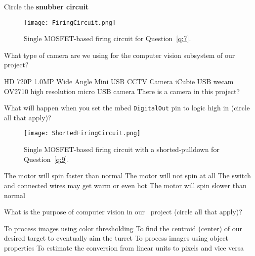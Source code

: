 \documentclass[addpoints,answers]{exam}
\begin{document}
\begin{questions}
\clearpage
\question[1]\label{q:7}
Circle the \textbf{snubber circuit} 
\begin{figure}[h]
\centering
	\texttt{[image: FiringCircuit.png]}
	\caption{Single MOSFET-based firing circuit for Question~\ref{q:7}.}
	\label{fig:FiringCircuitSnubber}
\end{figure}




\question[1]
What type of camera are we using for the computer vision subsystem of our project?
\begin{choices}
\choice HD 720P 1.0MP Wide Angle Mini USB CCTV Camera
\CorrectChoice iCubie USB wecam
\choice OV2710 high resolution micro USB camera
\choice There is a camera in this project?
\end{choices}







\question[1]\label{q:9}
What will happen when you set the mbed \lstinline{DigitalOut} pin to logic high in  (circle all that apply)?
\begin{figure}[h]
\centering
	\texttt{[image: ShortedFiringCircuit.png]}
	\caption{Single MOSFET-based firing circuit with a shorted-pulldown for Question~\ref{q:9}.}
	\label{fig:ShortedFiringCircuit}
\end{figure}
\begin{choices}
\choice The motor will spin faster than normal
\CorrectChoice The motor will not spin at all
\choice The switch and connected wires may get warm or even hot
\choice The motor will spin slower than normal 
\end{choices}






\question[1]
What is the purpose of computer vision in our \usnaCourseNumber\ project (circle all that apply)?
\begin{choices}
\choice To process images using color thresholding
\CorrectChoice To find the centroid (center) of our desired target to eventually aim the turret
\choice To process images using object properties
\choice To estimate the conversion from linear units to pixels and vice versa
\end{choices}

\end{questions}
\end{document}
